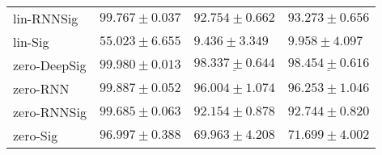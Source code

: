 \begin{tabular}{llll}
lin-RNNSig     &                           $ 99.767 \pm 0.037 $ &                           $ 92.754 \pm 0.662 $ &                           $ 93.273 \pm 0.656 $ \\
lin-Sig        &                           $ 55.023 \pm 6.655 $ &                            $ 9.436 \pm 3.349 $ &                            $ 9.958 \pm 4.097 $ \\
zero-DeepSig   &               $  \mathbf{ 99.980 \pm 0.013 } $ &            $  \underline{ 98.337 \pm 0.644 } $ &            $  \underline{ 98.454 \pm 0.616 } $ \\
zero-RNN       &                           $ 99.887 \pm 0.052 $ &                           $ 96.004 \pm 1.074 $ &                           $ 96.253 \pm 1.046 $ \\
zero-RNNSig    &                           $ 99.685 \pm 0.063 $ &                           $ 92.154 \pm 0.878 $ &                           $ 92.744 \pm 0.820 $ \\
zero-Sig       &                           $ 96.997 \pm 0.388 $ &                           $ 69.963 \pm 4.208 $ &                           $ 71.699 \pm 4.002 $ \\
\bottomrule
\end{tabular}
